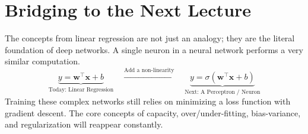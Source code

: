 \documentclass{article}
\newcommand{\w}{\mathbf{w}}
\newcommand{\x}{\mathbf{x}}
\newcommand{\T}{^\top}
\begin{document}
\section{Bridging to the Next Lecture}
The concepts from linear regression are not just an analogy; they are the literal foundation of deep networks. A single neuron in a neural network performs a very similar computation.
\[ \underbrace{y = \w\T\x + b}_{\text{Today: Linear Regression}} \quad \xrightarrow{\text{Add a non-linearity}} \quad \underbrace{y = \sigma(\w\T\x + b)}_{\text{Next: A Perceptron / Neuron}} \]
Training these complex networks still relies on minimizing a loss function with gradient descent. The core concepts of capacity, over/under-fitting, bias-variance, and regularization will reappear constantly.

\newpage
\end{document}
